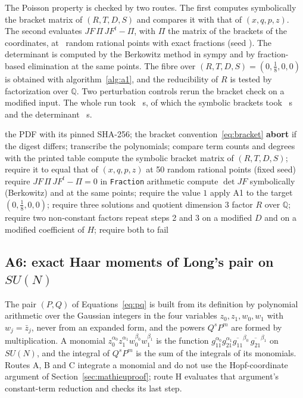 \documentclass[11pt]{article}
\theoremstyle{remark}
\newcommand{\Q}{\mathbb{Q}}
\begin{document}
The Poisson property is checked by two routes. The first computes symbolically the bracket matrix of $(R,T,D,S)$ and compares it with that of $(x,q,p,z)$. The second evaluates $JF\,\Pi\,JF^t-\Pi$, with $\Pi$ the matrix of the brackets of the coordinates, at \npoissonpts\ random rational points with exact fractions (seed \npoissonseed). The determinant is computed by the Berkowitz method in sympy and by fraction-based elimination at the same points. The fibre over $(R,T,D,S)=(0,\tfrac18,0,0)$ is obtained with algorithm~\ref{alg:a1}, and the reducibility of $R$ is tested by factorization over $\Q$. Two perturbation controls rerun the bracket check on a modified input. The whole run took \npoissonseconds\ s, of which the symbolic brackets took \npoissonbrk\ s and the determinant \npoissondet\ s.

\begin{algorithm}[t]
\caption{A5, exact check that a map is a non-automorphic Poisson endomorphism.}\label{alg:a5}
\begin{algorithmic}[1]
\Require the PDF with its pinned SHA-256; the bracket convention~\eqref{eq:bracket}
\State \textbf{abort} if the digest differs; transcribe the polynomials; compare term counts and degrees with the printed table
\State compute the symbolic bracket matrix of $(R,T,D,S)$; require it to equal that of $(x,q,p,z)$
\State at 50 random rational points (fixed seed) require $JF\,\Pi\,JF^t-\Pi=0$ in \texttt{Fraction} arithmetic
\State compute $\det JF$ symbolically (Berkowitz) and at the same points; require the value $1$
\State apply A1 to the target $(0,\tfrac18,0,0)$; require three solutions and quotient dimension $3$
\State factor $R$ over $\Q$; require two non-constant factors
\State repeat steps 2 and 3 on a modified $D$ and on a modified coefficient of $H$; require both to fail
\end{algorithmic}
\end{algorithm}

\subsection{A6: exact Haar moments of Long's pair on \texorpdfstring{$SU(N)$}{SU(N)}}\label{sec:a6}

The pair $(P,Q)$ of Equations~\eqref{eq:pq} is built from its definition by polynomial arithmetic over the Gaussian integers in the four variables $z_0,z_1,w_0,w_1$ with $w_j=\bar z_j$, never from an expanded form, and the powers $Q^sP^m$ are formed by multiplication. A monomial $z_0^{\alpha_0}z_1^{\alpha_1}w_0^{\beta_0}w_1^{\beta_1}$ is the function $g_{11}^{\alpha_0}g_{21}^{\alpha_1}\overline{g_{11}}^{\beta_0}\,\overline{g_{21}}^{\beta_1}$ on $SU(N)$, and the integral of $Q^sP^m$ is the sum of the integrals of its monomials. Routes A, B and C integrate a monomial and do not use the Hopf-coordinate argument of Section~\ref{sec:mathieuproof}; route H evaluates that argument's constant-term reduction and checks its last step.
\end{document}
